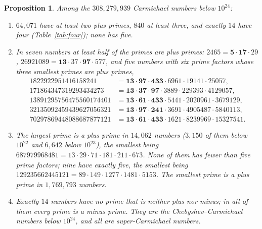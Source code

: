\documentclass[11pt]{amsart}
\newtheorem{proposition}[theorem]{Proposition}
\theoremstyle{definition}
\theoremstyle{remark}
\begin{document}
\begin{proposition}\label{prop:near}
Among the $308{,}279{,}939$ Carmichael numbers below $10^{24}$:
\begin{enumerate}[label=\textup{(\alph*)}]
\item $64{,}071$ have at least two plus primes, $840$ at least three, and exactly $14$ have four (Table~\ref{tab:four}); none has five.
\item In seven numbers at least half of the primes are plus primes: $2465=\mathbf5\cdot\mathbf{17}\cdot29$, $26921089=\mathbf{13}\cdot37\cdot\mathbf{97}\cdot577$, and five numbers with six prime factors whose three smallest primes are plus primes,
\begin{align*}
1822922951416158241&=\mathbf{13}\cdot\mathbf{97}\cdot\mathbf{433}\cdot6961\cdot19141\cdot25057,\\
171864347319293434273&=\mathbf{13}\cdot\mathbf{37}\cdot\mathbf{97}\cdot3889\cdot229393\cdot4129057,\\
13891295756475560174401&=\mathbf{13}\cdot\mathbf{61}\cdot\mathbf{433}\cdot5441\cdot2020961\cdot3679129,\\
32135092459439627056321&=\mathbf{13}\cdot\mathbf{97}\cdot\mathbf{241}\cdot3691\cdot4905487\cdot5840113,\\
70297869448088687877121&=\mathbf{13}\cdot\mathbf{61}\cdot\mathbf{433}\cdot1621\cdot8239969\cdot15327541.
\end{align*}
\item The largest prime is a plus prime in $14{,}062$ numbers ($3{,}150$ of them below $10^{22}$ and $6{,}642$ below $10^{23}$), the smallest being $687979968481=13\cdot29\cdot71\cdot181\cdot211\cdot673$. None of them has fewer than five prime factors; nine have exactly five, the smallest being $129235662445121=89\cdot149\cdot1277\cdot1481\cdot5153$. The smallest prime is a plus prime in $1{,}769{,}793$ numbers.
\item Exactly $14$ numbers have no prime that is neither plus nor minus; in all of them every prime is a minus prime. They are the Chebyshev--Carmichael numbers below $10^{24}$, and all are super-Carmichael numbers.
\end{enumerate}
\end{proposition}
\end{document}
